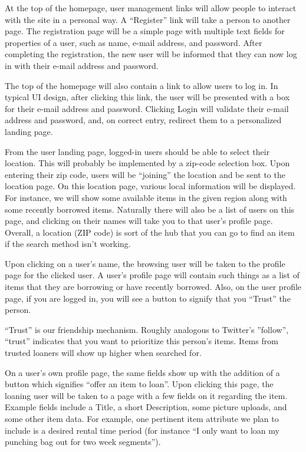 \documentclass{acm_proc_article-sp}
\begin{document}
At the top of the homepage, user management links will allow people to interact with the site in a personal way. 
A ``Register'' link will take a person to another page. The registration page will be a simple page with multiple 
text fields for properties of a user, such as name, e-mail address, and password. After completing the registration, the new user will be informed that they can now log in with their e-mail address and password.

The top of the homepage will also contain a link to allow users to log in. In typical UI design, after clicking this link, the user will be presented with a box for their e-mail address and password. Clicking Login will validate their e-mail address and password, and, on correct entry, redirect them to a personalized landing page.

From the user landing page, logged-in users should be able to select their location. This will probably be implemented by a zip-code selection box. Upon entering their zip code, users will be ``joining'' the location and be sent to the location page.
On this location page, various local information will be displayed. For instance, we will show some available items in the given region along with some recently borrowed items. Naturally there will also be a list of users on this page, and clicking on their names will take you to that user's profile page. Overall, a location (ZIP code) is sort of the hub that you can go to find an item if the search method isn't working.

Upon clicking on a user's name, the browsing user will be taken to the profile page for the clicked user. A user's profile page will contain such things as a list of items that they are borrowing or have recently borrowed. Also, on the user profile page, if you are logged in, you will see a button to signify that you ``Trust'' the person.

``Trust'' is our friendship mechanism. Roughly analogous to Twitter's ''follow'', ``trust'' indicates that you want to prioritize this person's items. Items from trusted loaners will show up higher when searched for.

On a user's own profile page, the same fields show up with the addition of a button which signifies ``offer an item to loan''. Upon clicking this page, the loaning user will be taken to a page with a few fields on it regarding the item. Example fields include a Title, a short Description, some picture uploads, and some other item data. For example, one pertinent item attribute we plan to include is a desired rental time period (for instance ``I only want to loan my punching bag out for two week segments'').
\end{document}
